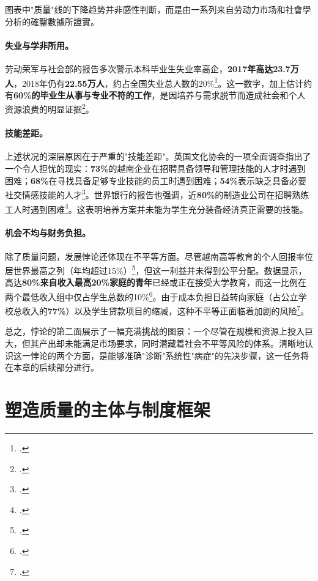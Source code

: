 图表中"质量"线的下降趋势并非感性判断，而是由一系列来自劳动力市场和社會學分析的確鑿數據所證實。

\paragraph{失业与学非所用。} 劳动荣军与社会部的报告多次警示本科毕业生失业率高企，\textbf{2017年高达23.7万人}，2018年仍有\textbf{22.55万人}，约占全国失业总人数的20\%\footcite{vietnamnews_unemployed_2017}。这一数字，加上估计约有\textbf{60\%的毕业生从事与专业不符的工作}，是因培养与需求脱节而造成社会和个人资源浪费的明显证据\footcite{britishcouncil_grad_employability_2021}。

\paragraph{技能差距。} 上述状况的深层原因在于严重的"技能差距"。英国文化协会的一项全面调查指出了一个令人担忧的现实：\textbf{73\%}的越南企业在招聘具备领导和管理技能的人才时遇到困难；\textbf{68\%}在寻找具备足够专业技能的员工时遇到困难；\textbf{54\%}表示缺乏具备必要社交情感技能的人才\footcite{britishcouncil_skills_gap_2021}。世界银行的报告也强调，近\textbf{80\%}的制造业公司在招聘熟练工人时遇到困难\footcite{worldbank_p178112}。这表明培养方案并未能为学生充分装备经济真正需要的技能。

\paragraph{机会不均与财务负担。} 除了质量问题，发展悖论还体现在不平等方面。尽管越南高等教育的个人回报率位居世界最高之列（年均超过15\%）\footcite{worldbank_improvingperformance_2020}，但这一利益并未得到公平分配。数据显示，高达\textbf{80\%来自收入最高20\%家庭的青年}已经或正在接受大学教育，而这一比例在两个最低收入组中仅占学生总数的10\%\footcite{worldbank_p178112}。由于成本负担日益转向家庭（占公立学校总收入的\textbf{77\%}）以及学生贷款项目的缩减，这种不平等正面临着加剧的风险\footcite{worldbank_p178112}。

总之，悖论的第二面展示了一幅充满挑战的图景：一个尽管在规模和资源上投入巨大，但其产出却未能满足市场要求，同时潜藏着社会不平等风险的体系。清晰地认识这一悖论的两个方面，是能够准确"诊断"系统性"病症"的先决步骤，这一任务将在本章的后续部分进行。





\section{塑造质量的主体与制度框架}
\label{sec:khung_the_che}

